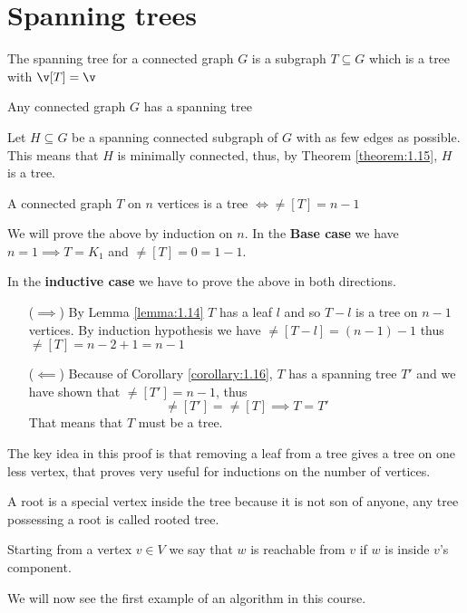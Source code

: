 \section{Spanning trees}
\begin{definition}
    The spanning tree for a connected graph $G$ is a subgraph $T \subseteq G$ which is a tree with $\v[T] = \v$
\end{definition}
\begin{customcorollary}{1.16}
    \label{corollary:1.16}
    Any connected graph $G$ has a spanning tree
\end{customcorollary}
\begin{prf}
    Let $H \subseteq G$ be a spanning connected subgraph of $G$ with as few edges as possible. This means that $H$ is minimally connected, thus, by Theorem \ref{theorem:1.15}, $H$ is a tree.
\end{prf}
\begin{customtheorem}{1.17}
    \label{theorem:1.17}
    A connected graph $T$ on $n$ vertices is a tree $\iff \ne[T] = n - 1$
\end{customtheorem}
\begin{prf}
    We will prove the above by induction on $n$. In the \textbf{Base case} we have $n = 1 \implies T = K_1$ and $\ne[T] = 0 = 1 - 1$.

    In the \textbf{inductive case} we have to prove the above in both directions.
    \begin{itemize}
        \item [($\implies$)] By Lemma \ref{lemma:1.14} $T$ has a leaf $l$ and so $T - l$ is a tree on $n - 1$ vertices. By induction hypothesis we have $\ne[T - l] = (n - 1) - 1$ thus $\ne[T] = n - 2 + 1 = n - 1$
        \item [($\impliedby$)] Because of Corollary \ref{corollary:1.16}, $T$ has a spanning tree $T'$ and we have shown that $\ne[T'] = n - 1$, thus
        \begin{equation*}
            \ne[T'] = \ne[T] \implies T = T'
        \end{equation*}
        That means that $T$ must be a tree.
    \end{itemize}
\end{prf}
\begin{coolfact}
    The key idea in this proof is that removing a leaf from a tree gives a tree on one less vertex, that proves very useful for inductions on the number of vertices.
\end{coolfact}
\begin{definition}[Root]
    A root is a special vertex inside the tree because it is not son of anyone, any tree possessing a root is called rooted tree.
\end{definition}
\begin{definition}[Reachability]
    Starting from a  vertex $v \in V$ we say that $w$ is reachable from $v$ if $w$ is inside $v$'s component.
\end{definition}
We will now see the first example of an algorithm in this course.
